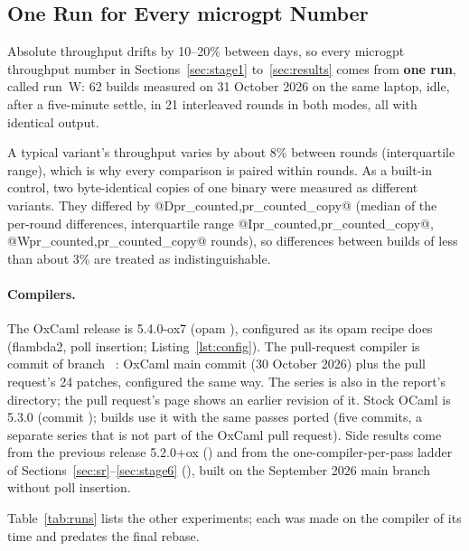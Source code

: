 \subsection{One Run for Every microgpt Number}
\label{sec:runu}
Absolute throughput drifts by 10--20\% between days, so every microgpt
throughput number in Sections~\ref{sec:stage1} to~\ref{sec:results} comes
from \textbf{one run}, called run~W: 62 builds measured on 31 October 2026 on
the same laptop, idle, after a five-minute settle, in 21 interleaved rounds in
both modes, all with identical output.

A typical variant's throughput varies by about 8\% between rounds
(interquartile range), which is why every comparison is paired within rounds.
As a built-in control, two byte-identical copies of one binary were measured
as different variants. They differed by @D{pr_counted,pr_counted_copy}@
(median of the per-round differences, interquartile range
@I{pr_counted,pr_counted_copy}@, @W{pr_counted,pr_counted_copy}@ rounds), so
differences between builds of less than about 3\% are treated as
indistinguishable.

\paragraph{Compilers.} The OxCaml release is 5.4.0-ox7 (opam
), configured as its opam recipe does
(flambda2, poll insertion; Listing~\ref{lst:config}). The pull-request
compiler is commit  of branch
~\cite{oxcaml_pr}: OxCaml main commit 
(30 October 2026) plus the pull request's 24 patches, configured the same
way. The series is also in the report's  directory; the
pull request's page shows an earlier revision of it. Stock
OCaml is 5.3.0 (commit );  builds use it with
the same passes ported (five commits, a separate series that is not part of
the OxCaml pull request). Side results come from the previous release
5.2.0+ox () and from the one-compiler-per-pass ladder of
Sections~\ref{sec:sr}--\ref{sec:stage6} (), built on the
September 2026 main branch without poll insertion.

Table~\ref{tab:runs} lists the other experiments; each was made on the
compiler of its time and predates the final rebase.

